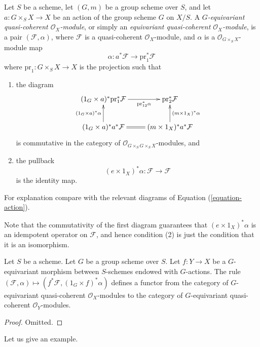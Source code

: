 \begin{definition}
\label{definition-equivariant-module}
Let $S$ be a scheme, let $(G, m)$ be a group scheme over $S$, and
let $a : G \times_S X \to X$ be an action of the group scheme $G$
on $X/S$. A {\it $G$-equivariant quasi-coherent $\mathcal{O}_X$-module},
or simply an {\it equivariant quasi-coherent $\mathcal{O}_X$-module},
is a pair $(\mathcal{F}, \alpha)$, where $\mathcal{F}$ is a quasi-coherent
$\mathcal{O}_X$-module, and $\alpha$ is a $\mathcal{O}_{G \times_S X}$-module
map
$$
\alpha : a^*\mathcal{F} \longrightarrow \text{pr}_1^*\mathcal{F}
$$
where $\text{pr}_1 : G \times_S X \to X$ is the projection
such that
\begin{enumerate}
\item the diagram
$$
\xymatrix{
(1_G \times a)^*\text{pr}_1^*\mathcal{F} \ar[r]_-{\text{pr}_{12}^*\alpha} &
\text{pr}_2^*\mathcal{F} \\
(1_G \times a)^*a^*\mathcal{F} \ar[u]^{(1_G \times a)^*\alpha} \ar@{=}[r] &
(m \times 1_X)^*a^*\mathcal{F} \ar[u]_{(m \times 1_X)^*\alpha}
}
$$
is commutative in the category of
$\mathcal{O}_{G \times_S G \times_S X}$-modules, and
\item the pullback
$$
(e \times 1_X)^*\alpha : \mathcal{F} \longrightarrow \mathcal{F}
$$
is the identity map.
\end{enumerate}
For explanation compare with the relevant diagrams of
Equation (\ref{equation-action}).
\end{definition}

\noindent
Note that the commutativity of the first diagram guarantees that
$(e \times 1_X)^*\alpha$ is an idempotent operator on $\mathcal{F}$,
and hence condition (2) is just the condition that it is an isomorphism.

\begin{lemma}
\label{lemma-pullback-equivariant}
Let $S$ be a scheme. Let $G$ be a group scheme over $S$.
Let $f : Y \to X$ be a $G$-equivariant morphism between $S$-schemes
endowed with $G$-actions. The rule
$(\mathcal{F}, \alpha) \mapsto (f^*\mathcal{F}, (1_G \times f)^*\alpha)$
defines a functor from the category of $G$-equivariant quasi-coherent
$\mathcal{O}_X$-modules  to the category of
$G$-equivariant quasi-coherent $\mathcal{O}_Y$-modules.
\end{lemma}

\begin{proof}
Omitted.
\end{proof}

\noindent
Let us give an example.

